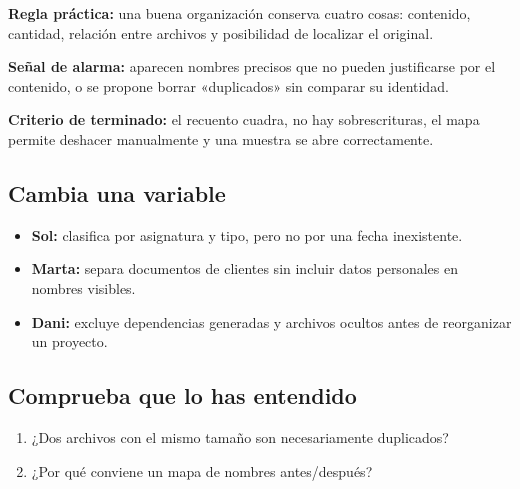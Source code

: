 \documentclass[10pt,a4paper,openany]{book}
\providecommand{\tightlist}{\setlength{\itemsep}{0.18em}\setlength{\parskip}{0pt}}
\begin{document}
\begin{tipbox}

\textbf{Regla práctica:} una buena organización conserva cuatro cosas:
contenido, cantidad, relación entre archivos y posibilidad de localizar
el original.

\end{tipbox}

\begin{warningbox}

\textbf{Señal de alarma:} aparecen nombres precisos que no pueden
justificarse por el contenido, o se propone borrar «duplicados» sin
comparar su identidad.

\end{warningbox}

\begin{successbox}

\textbf{Criterio de terminado:} el recuento cuadra, no hay
sobrescrituras, el mapa permite deshacer manualmente y una muestra se
abre correctamente.

\end{successbox}

\subsection{Cambia una variable}\label{cambia-una-variable-6}

\begin{itemize}
\tightlist
\item
  \textbf{Sol:} clasifica por asignatura y tipo, pero no por una fecha
  inexistente.
\item
  \textbf{Marta:} separa documentos de clientes sin incluir datos
  personales en nombres visibles.
\item
  \textbf{Dani:} excluye dependencias generadas y archivos ocultos antes
  de reorganizar un proyecto.
\end{itemize}

\subsection{Comprueba que lo has
entendido}\label{comprueba-que-lo-has-entendido-6}

\begin{enumerate}
\def\labelenumi{\arabic{enumi}.}
\tightlist
\item
  ¿Dos archivos con el mismo tamaño son necesariamente duplicados?
\item
  ¿Por qué conviene un mapa de nombres antes/después?
\end{enumerate}
\end{document}
